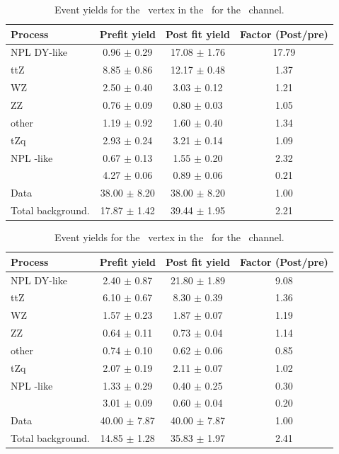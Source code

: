 \begin{table}[htbp]
	\centering
	\caption{Event yields for the \Zut\ vertex in the \TTSR\  for the \eemu\ channel. }
	\begin{tabular} {l c c c }
		\toprule
		Process & Prefit yield & Post fit yield & Factor (Post/pre) \\
		\midrule
		NPL DY-like & 0.96 $ \pm $ 0.29 & 17.08 $ \pm $ 1.76 & 17.79 \\ 
		ttZ & 8.85 $ \pm $ 0.86 & 12.17 $ \pm $ 0.48 & 1.37 \\ 
		WZ & 2.50 $ \pm $ 0.40 & 3.03 $ \pm $ 0.12 & 1.21 \\ 
		ZZ & 0.76 $ \pm $ 0.09 & 0.80 $ \pm $ 0.03 & 1.05 \\ 
		other & 1.19 $ \pm $ 0.92 & 1.60 $ \pm $ 0.40 & 1.34 \\ 
		tZq & 2.93 $ \pm $ 0.24 & 3.21 $ \pm $ 0.14 & 1.09 \\ 
		NPL \ttbar-like & 0.67 $ \pm $ 0.13 & 1.55 $ \pm $ 0.20 & 2.32\\
		\kZut  & 4.27 $ \pm $ 0.06 & 0.89 $ \pm $ 0.06 & 0.21\\
		\hdashline
		Data & 38.00 $ \pm $ 8.20 & 38.00 $ \pm $ 8.20 & 1.00\\
		Total background. & 17.87 $ \pm $ 1.42 & 39.44 $ \pm $ 1.95 & 2.21\\
		\bottomrule
	\end{tabular}
\end{table}
\begin{table}[htbp]
	\centering
	\caption{Event yields for the \Zut\ vertex in the \TTSR\  for the \eee\ channel. }
	\begin{tabular} {l c c c }
		\toprule
		Process & Prefit yield & Post fit yield & Factor (Post/pre) \\
		\midrule
		NPL DY-like & 2.40 $ \pm $ 0.87 & 21.80 $ \pm $ 1.89 & 9.08 \\ 
		ttZ & 6.10 $ \pm $ 0.67 & 8.30 $ \pm $ 0.39 & 1.36 \\ 
		WZ & 1.57 $ \pm $ 0.23 & 1.87 $ \pm $ 0.07 & 1.19 \\ 
		ZZ & 0.64 $ \pm $ 0.11 & 0.73 $ \pm $ 0.04 & 1.14 \\ 
		other & 0.74 $ \pm $ 0.10 & 0.62 $ \pm $ 0.06 & 0.85 \\ 
		tZq & 2.07 $ \pm $ 0.19 & 2.11 $ \pm $ 0.07 & 1.02 \\ 
		NPL \ttbar-like & 1.33 $ \pm $ 0.29 & 0.40 $ \pm $ 0.25 & 0.30\\
		\kZut  & 3.01 $ \pm $ 0.09 & 0.60 $ \pm $ 0.04 & 0.20\\
		\hdashline
		Data & 40.00 $ \pm $ 7.87 & 40.00 $ \pm $ 7.87 & 1.00\\
		Total background. & 14.85 $ \pm $ 1.28 & 35.83 $ \pm $ 1.97 & 2.41\\
		\bottomrule
	\end{tabular}
\end{table}
